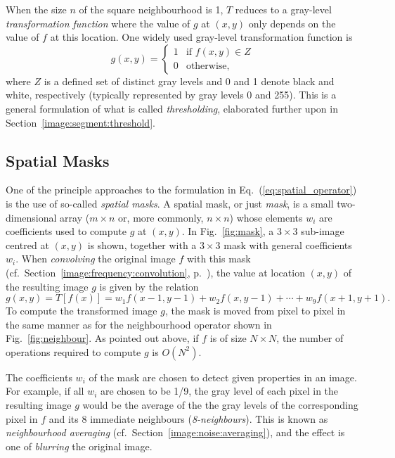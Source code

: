 When the size $n$ of the square neighbourhood is 1, $T$ reduces to a
gray-level {\em transformation function\/} where the value of $g$ at
$(x,y)$ only depends on the value of $f$ at this location.  One widely
used gray-level transformation function is
\begin{equation}
\label{eq:threshold:1}
  g(x,y)=\left\{ \begin{array}{ll} 
                   1 & \mbox{if $f(x,y)\in Z$} \\ 
                   0 & \mbox{otherwise,}
                 \end{array} \right.
\end{equation}
where $Z$ is a defined set of distinct gray levels and 0 and 1 denote
black and white, respectively (typically represented by gray levels 0
and 255).  This is a general formulation of what is called {\em
  thresholding\/}, elaborated further upon in
Section~\ref{image:segment:threshold}.

\subsection{Spatial Masks}
\label{image:spatial:mask}

One of the principle approaches to the formulation in
Eq.~(\ref{eq:spatial_operator}) is the use of so-called {\em spatial
  masks\/}.  A spatial mask, or just {\em mask\/}, is a small
two-dimensional array ($m\times n$ or, more commonly, $n\times n$)
whose elements $w_{i}$ are coefficients used to compute $g$ at
$(x,y)$.  In Fig.~\ref{fig:mask}, a $3\times 3$ sub-image centred at
$(x,y)$ is shown, together with a $3\times 3$ mask with general
coefficients $w_{i}$.  When {\em convolving\/} the original image $f$
with this mask (cf.\ Section~\ref{image:frequency:convolution},
p.~\pageref{pg:convolutionmasks}), the value at location $(x,y)$ of
the resulting image $g$ is given by the relation
\begin{equation}
\label{eq:mask}
g(x,y)=T[f(x)]=w_{1}f(x-1,y-1)+w_{2}f(x,y-1)+\cdots+w_{9}f(x+1,y+1)\mbox{.}
\end{equation}
To compute the transformed image $g$, the mask is moved from pixel to
pixel in the same manner as for the neighbourhood operator shown in
Fig.~\ref{fig:neighbour}.  As pointed out above, if $f$ is of size
$N\times N$, the number of operations required to compute $g$ is
$O(N^{2})$.

The coefficients $w_{i}$ of the mask are chosen to detect given
properties in an image.  For example, if all $w_{i}$ are chosen to be
1/9, the gray level of each pixel in the resulting image $g$ would be
the average of the the gray levels of the corresponding pixel in $f$
and its 8 immediate neighbours ({\em 8-neighbours\/}).  This is known
as {\em neighbourhood averaging\/} (cf.\
Section~\ref{image:noise:averaging}), and the effect is one of {\em
  blurring\/} the original image.

